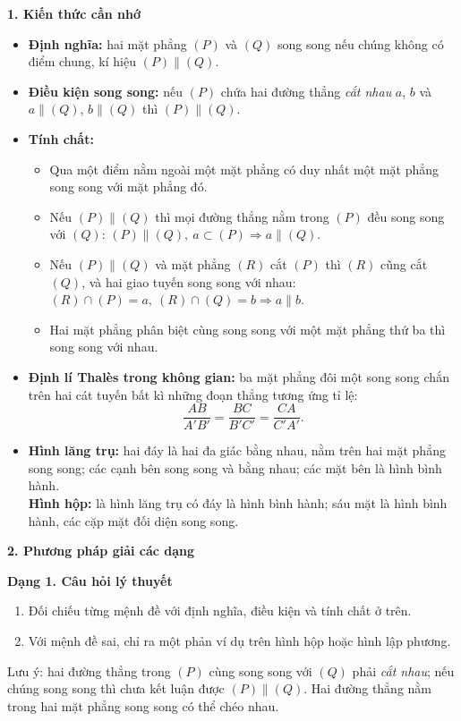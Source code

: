 \textbf{1. Kiến thức cần nhớ}
\begin{itemize}
\item \textbf{Định nghĩa:} hai mặt phẳng $(P)$ và $(Q)$ song song nếu chúng không có điểm chung, kí hiệu $(P)\parallel(Q)$.
\item \textbf{Điều kiện song song:} nếu $(P)$ chứa hai đường thẳng \emph{cắt nhau} $a$, $b$ và $a\parallel(Q)$, $b\parallel(Q)$ thì $(P)\parallel(Q)$.
\item \textbf{Tính chất:}
\begin{itemize}
\item Qua một điểm nằm ngoài một mặt phẳng có duy nhất một mặt phẳng song song với mặt phẳng đó.
\item Nếu $(P)\parallel(Q)$ thì mọi đường thẳng nằm trong $(P)$ đều song song với $(Q)$: \quad $\boxed{(P)\parallel(Q),\ a\subset(P)\Rightarrow a\parallel(Q)}$.
\item Nếu $(P)\parallel(Q)$ và mặt phẳng $(R)$ cắt $(P)$ thì $(R)$ cũng cắt $(Q)$, và hai giao tuyến song song với nhau: \quad $\boxed{(R)\cap(P)=a,\ (R)\cap(Q)=b\Rightarrow a\parallel b}$.
\item Hai mặt phẳng phân biệt cùng song song với một mặt phẳng thứ ba thì song song với nhau.
\end{itemize}
\item \textbf{Định lí Thalès trong không gian:} ba mặt phẳng đôi một song song chắn trên hai cát tuyến bất kì những đoạn thẳng tương ứng tỉ lệ:
\[ \dfrac{AB}{A'B'}=\dfrac{BC}{B'C'}=\dfrac{CA}{C'A'}. \]
\item \textbf{Hình lăng trụ:} hai đáy là hai đa giác bằng nhau, nằm trên hai mặt phẳng song song; các cạnh bên song song và bằng nhau; các mặt bên là hình bình hành.\\
\textbf{Hình hộp:} là hình lăng trụ có đáy là hình bình hành; sáu mặt là hình bình hành, các cặp mặt đối diện song song.
\end{itemize}

\textbf{2. Phương pháp giải các dạng}

\textbf{Dạng 1. Câu hỏi lý thuyết}
\begin{enumerate}
\item Đối chiếu từng mệnh đề với định nghĩa, điều kiện và tính chất ở trên.
\item Với mệnh đề sai, chỉ ra một phản ví dụ trên hình hộp hoặc hình lập phương.
\end{enumerate}
Lưu ý: hai đường thẳng trong $(P)$ cùng song song với $(Q)$ phải \emph{cắt nhau}; nếu chúng song song thì chưa kết luận được $(P)\parallel(Q)$. Hai đường thẳng nằm trong hai mặt phẳng song song có thể chéo nhau.

